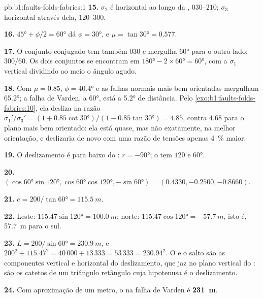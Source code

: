 \begin{solution}{pb:b1:faults-folds-fabrics:1}
\textbf{15.} $\sigma_2$ é horizontal ao longo da , $030$--$210$; $\sigma_3$ horizontal através dela, $120$--$300$.

\textbf{16.} $\ang{45} + \phi/2 = \ang{60}$ dá $\phi = \ang{30}$, e
$\mu = \tan\ang{30} = 0.577$.

\textbf{17.} O conjunto conjugado tem também  $030$ e mergulha \ang{60} para o outro lado: $300/60$. Os dois conjuntos se encontram em $\ang{180} - 2\times\ang{60} = \ang{60}$, com a $\sigma_1$ vertical dividindo ao meio o ângulo agudo.

\textbf{18.} Com $\mu = 0.85$, $\phi = \ang{40.4}$ e as falhas normais mais bem orientadas mergulham \ang{65.2}; a falha de Varden, a \ang{60}, está a \ang{5.2} de distância. Pelo \cref{exo:b1:faults-folds-fabrics:10}, ela desliza na razão $\sigma_1'/\sigma_3' = (1 + 0.85\cot\ang{30})/(1 - 0.85\tan\ang{30}) = 4.85$, contra $4.68$ para o plano mais bem orientado: ela está quase, mas não exatamente, na melhor orientação, e deslizaria de novo com uma razão de tensões apenas \qty{4}{\percent} maior.

\textbf{19.} O deslizamento é para baixo do : $r = \ang{-90}$; o  tem 
$120$ e  \ang{60}.

\textbf{20.} $(\cos\ang{60}\sin\ang{120}, \cos\ang{60}\cos\ang{120},
-\sin\ang{60}) = (0.4330, -0.2500, -0.8660)$.

\textbf{21.} $e = 200/\tan\ang{60} = \qty{115.5}{m}$.

\textbf{22.} Leste: $115.47\sin\ang{120} = \qty{100.0}{m}$; norte:
$115.47\cos\ang{120} = \qty{-57.7}{m}$, isto é, \qty{57.7}{m} para o sul.

\textbf{23.} $L = 200/\sin\ang{60} = \qty{230.9}{m}$, e
$200^2 + 115.47^2 = 40\,000 + 13\,333 = 53\,333 = 230.94^2$. O  e o salto são as componentes vertical e horizontal do deslizamento, que jaz no plano vertical do : são os catetos de um triângulo retângulo cuja hipotenusa é o deslizamento.

\textbf{24.} Com aproximação de um metro, o  na falha de Varden é
\textbf{\qty[text-series-to-math=true]{231}{m}}.
\end{solution}
